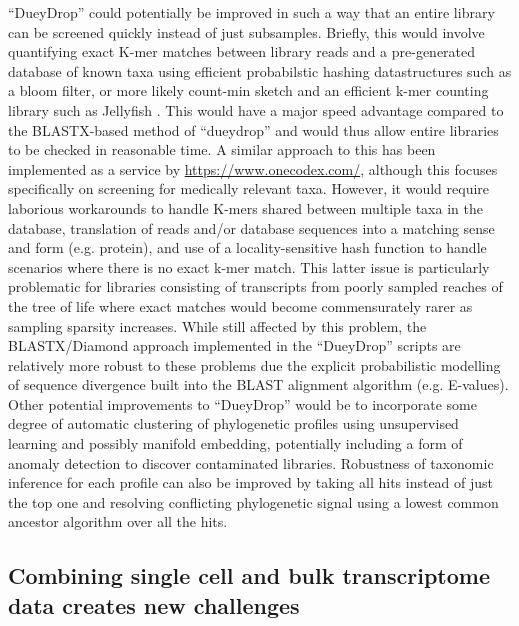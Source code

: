 ``DueyDrop'' could potentially be improved in such a way that an entire library can be screened quickly instead of just subsamples.
Briefly, this would involve quantifying exact K-mer matches between library reads and a pre-generated database of known taxa
using efficient probabilstic hashing datastructures such as a bloom filter, or more likely count-min sketch and an efficient
k-mer counting library such as Jellyfish \citep{Marcais2011}.  This would have a major speed advantage compared to the BLASTX-based method of ``dueydrop''
and would thus allow entire libraries to be checked in reasonable time.  A similar approach to this has been implemented as a service
by \url{https://www.onecodex.com/}, although this focuses specifically on screening for medically relevant taxa. 
However, it would require laborious workarounds to handle
K-mers shared between multiple taxa in the database, translation of reads and/or database sequences into a matching sense and form (e.g. protein),
and use of a locality-sensitive hash function to handle scenarios where there is no exact k-mer match. This latter issue is particularly
problematic for libraries consisting of transcripts from poorly sampled reaches of the tree of life where exact matches would become
commensurately rarer as sampling sparsity increases.  
While still affected by this problem, the BLASTX/Diamond approach implemented in the ``DueyDrop'' scripts are relatively more robust to these
problems due the explicit probabilistic modelling of sequence divergence built into the BLAST alignment algorithm (e.g. E-values).
Other potential improvements to ``DueyDrop'' would be to incorporate some degree of 
automatic clustering of phylogenetic profiles using unsupervised learning and possibly manifold embedding, potentially
including a form of anomaly detection to discover contaminated libraries.  
Robustness of taxonomic inference for each profile can also be improved by taking all hits instead of just the top one
and resolving conflicting phylogenetic signal using a lowest common ancestor algorithm over all the hits.

\subsection{Combining single cell and bulk transcriptome data creates new challenges}

